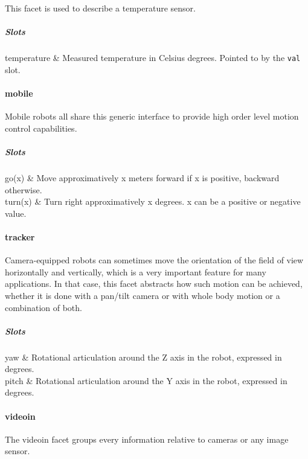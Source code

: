 This facet is used to describe a temperature sensor.

\subparagraph{Slots}

\begin{slots}
temperature &
Measured temperature in Celsius degrees.
Pointed to by the \texttt{val} slot.\\\hline
\end{slots}

\paragraph{mobile}

Mobile robots all share this generic interface to provide high order
level motion control capabilities.

\subparagraph{Slots}

\begin{slots}
go(x) &
Move approximatively x meters forward
if x is positive, backward otherwise.\\\hline
turn(x) &
Turn right approximatively x degrees.
x can be a positive or negative value.\\\hline
\end{slots}

\paragraph{tracker}

Camera-equipped robots can sometimes move the orientation of the field
of view horizontally and vertically, which is a very important feature
for many applications. In that case, this facet abstracts how such
motion can be achieved, whether it is done with a pan/tilt camera or
with whole body motion or a combination of both.

\subparagraph{Slots}

\begin{slots}
yaw &
Rotational articulation around the Z
axis in the robot, expressed in degrees.\\\hline
pitch &
Rotational articulation around the Y
axis in the robot, expressed in degrees.\\\hline
\end{slots}

\paragraph{videoin}

The videoin facet groups every information relative to cameras or any
image sensor.

